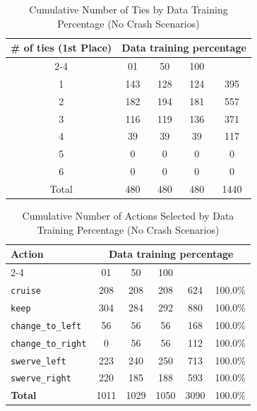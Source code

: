 \documentclass{article}
\begin{document}
\begin{table}[h]
\centering
\caption{Cumulative Number of Ties by Data Training Percentage (No Crash Scenarios)}
\begin{tabular}{c|ccc|c}
\toprule
\multirow{2}{*}{\# of ties (1st Place)} & \multicolumn{5}{c|}{Data training percentage} & \multirow{2}{*}{Total} \\
\cmidrule{2-4}
 & 01 & 50 & 100 & \\
\midrule
1 & 143 & 128 & 124 & 395 \\ 
2 & 182 & 194 & 181 & 557 \\ 
3 & 116 & 119 & 136 & 371 \\ 
4 & 39 & 39 & 39 & 117 \\ 
5 & 0 & 0 & 0 & 0 \\ 
6 & 0 & 0 & 0 & 0 \\ 
\midrule
Total & 480 & 480 & 480 & 1440 \\ 
\bottomrule
\end{tabular}
\end{table}

\begin{table}[h]
\centering
\caption{Cumulative Number of Actions Selected by Data Training Percentage (No Crash Scenarios)}
\begin{tabular}{l|ccc|c|c}
\toprule
\multirow{2}{*}{Action} & \multicolumn{5}{c|}{Data training percentage} & \multirow{2}{*}{Total} & \multirow{2}{*}{Safe (\%)} \\
\cmidrule{2-4}
 & 01 & 50  & 100 & & \\
\midrule
\texttt{cruise} & 208 & 208 & 208 & 624 & 100.0\% \\ 
\texttt{keep} & 304 & 284 & 292 & 880 & 100.0\% \\ 
\texttt{change\_to\_left} & 56 & 56 & 56 & 168 & 100.0\% \\ 
\texttt{change\_to\_right} & 0 & 56 & 56 & 112 & 100.0\% \\ 
\texttt{swerve\_left} & 223 & 240 & 250 & 713 & 100.0\% \\ 
\texttt{swerve\_right} & 220 & 185 & 188 & 593 & 100.0\% \\ 
\midrule
\textbf{Total} & 1011 & 1029 & 1050 & 3090 & 100.0\% \\ 
\bottomrule
\end{tabular}
\end{table}
\end{document}
